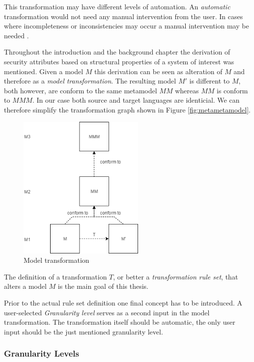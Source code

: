 This transformation may have different levels of automation. An \textit{automatic} transformation would not need any manual intervention from the user. In cases where incompleteness or inconsistencies may occur a manual intervention may be needed \cite{mt_taxonomy}.

Throughout the introduction and the background chapter the derivation of security attributes based on structural properties of a system of interest was mentioned. Given a model $M$ this derivation can be seen as alteration of $M$ and therefore as a \textit{model transformation}. The resulting model $M'$ is different to $M$, both however, are conform to the same metamodel $MM$ whereas $MM$ is conform to $MMM$. In our case both source and target languages are identicial. We can therefore simplify the transformation graph shown in Figure \ref{fig:metametamodel}.

\begin{figure}[H]
\centering
\includegraphics[width=0.55\textwidth]{pictures/transformation.png}
\caption{Model transformation}
\label{fig:transformation}
\end{figure}

The definition of a transformation $T$, or better a \textit{transformation rule set}, that alters a model $M$ is the main goal of this thesis.

Prior to the actual rule set definition one final concept has to be introduced. A user-selected \textit{Granularity level} serves as a second input in the model transformation. The transformation itself should be automatic, the only user input should be the just mentioned granularity level.

\subsubsection{Granularity Levels}
\label{subsubsec:granularity}

